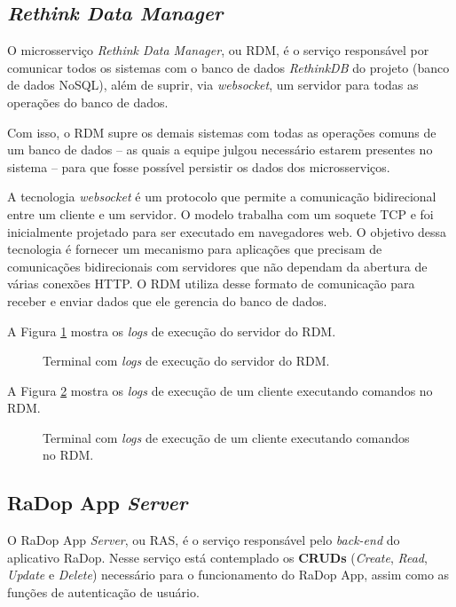 \subsection{\textit{Rethink Data Manager}}

O microsserviço \textit{Rethink Data Manager}, ou RDM,  é o serviço responsável por comunicar todos os sistemas com o banco de dados \textit{RethinkDB} do projeto (banco de dados NoSQL), além de suprir, via \textit{websocket}, um servidor para todas as operações do banco de dados.

Com isso, o RDM supre os demais sistemas com todas as operações comuns de um banco de dados -- as quais a equipe julgou necessário estarem presentes no sistema -- para que fosse possível persistir os dados dos microsserviços. 

A tecnologia \textit{websocket} é um protocolo que permite a comunicação bidirecional entre um cliente e um servidor. O modelo trabalha com um soquete TCP e foi inicialmente projetado para ser executado em navegadores web. O objetivo dessa tecnologia é fornecer um mecanismo para aplicações que precisam de comunicações bidirecionais com servidores que não dependam da abertura de várias conexões HTTP. O RDM utiliza desse formato de comunicação para receber e enviar dados que ele gerencia do banco de dados.

A Figura \ref{fig:rdm-server} mostra os \textit{logs} de execução do servidor do RDM. 

\begin{figure}[H]
	\caption{\label{fig:rdm-server} Terminal com \textit{logs} de execução do servidor do RDM.}
\end{figure}

A Figura \ref{fig:rdm-cliente} mostra os \textit{logs} de execução de um cliente executando comandos no RDM. 

\begin{figure}[H]
	\caption{\label{fig:rdm-cliente} Terminal com \textit{logs} de execução de um cliente executando comandos no RDM.}
\end{figure}

\subsection{RaDop App \textit{Server}}

O RaDop App \textit{Server}, ou RAS, é o serviço responsável pelo \textit{back-end} do aplicativo RaDop. Nesse serviço está contemplado os \textbf{CRUDs} (\textit{Create}, \textit{Read}, \textit{Update} e \textit{Delete}) necessário para o funcionamento do RaDop App, assim como as funções de autenticação de usuário.


